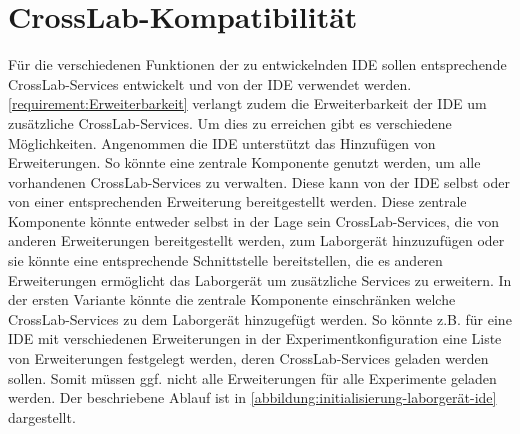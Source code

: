 \section{CrossLab-Kompatibilität}\label{section:konzeption:crosslab-kompatibilität}


Für die verschiedenen Funktionen der zu entwickelnden IDE sollen entsprechende CrossLab-Services entwickelt und von der IDE verwendet werden. \autoref{requirement:Erweiterbarkeit} verlangt zudem die Erweiterbarkeit der IDE um zusätzliche CrossLab-Services. Um dies zu erreichen gibt es verschiedene Möglichkeiten. Angenommen die IDE unterstützt das Hinzufügen von Erweiterungen. So könnte eine zentrale Komponente genutzt werden, um alle vorhandenen CrossLab-Services zu verwalten. Diese kann von der IDE selbst oder von einer entsprechenden Erweiterung bereitgestellt werden. Diese zentrale Komponente könnte entweder selbst in der Lage sein CrossLab-Services, die von anderen Erweiterungen bereitgestellt werden, zum Laborgerät hinzuzufügen oder sie könnte eine entsprechende Schnittstelle bereitstellen, die es anderen Erweiterungen ermöglicht das Laborgerät um zusätzliche Services zu erweitern. In der ersten Variante könnte die zentrale Komponente einschränken welche CrossLab-Services zu dem Laborgerät hinzugefügt werden. So könnte z.B. für eine IDE mit verschiedenen Erweiterungen in der Experimentkonfiguration eine Liste von Erweiterungen festgelegt werden, deren CrossLab-Services geladen werden sollen. Somit müssen ggf. nicht alle Erweiterungen für alle Experimente geladen werden. Der beschriebene Ablauf ist in \autoref{abbildung:initialisierung-laborgerät-ide} dargestellt.

